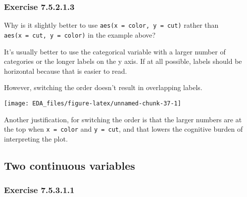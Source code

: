\documentclass[]{book}
\newenvironment{Shaded}{\begin{snugshade}}{\end{snugshade}}
\newcommand{\DataTypeTok}[1]{\textcolor[rgb]{0.13,0.29,0.53}{#1}}
\newcommand{\KeywordTok}[1]{\textcolor[rgb]{0.13,0.29,0.53}{\textbf{#1}}}
\newcommand{\NormalTok}[1]{#1}
\newcommand{\OperatorTok}[1]{\textcolor[rgb]{0.81,0.36,0.00}{\textbf{#1}}}
\newcommand{\StringTok}[1]{\textcolor[rgb]{0.31,0.60,0.02}{#1}}
\theoremstyle{plain}
\theoremstyle{remark}
\begin{document}
\hypertarget{exercise-7.5.2.1.3}{%
\subsubsection*{\texorpdfstring{Exercise
{7.5.2.1.3}}{Exercise 7.5.2.1.3}}\label{exercise-7.5.2.1.3}}

Why is it slightly better to use \texttt{aes(x\ =\ color,\ y\ =\ cut)}
rather than \texttt{aes(x\ =\ cut,\ y\ =\ color)} in the example above?

It's usually better to use the categorical variable with a larger number
of categories or the longer labels on the y axis. If at all possible,
labels should be horizontal because that is easier to read.

However, switching the order doesn't result in overlapping labels.

\begin{Shaded}
\end{Shaded}

\begin{center}\texttt{[image: EDA\_files/figure-latex/unnamed-chunk-37-1]} \end{center}

Another justification, for switching the order is that the larger
numbers are at the top when \texttt{x\ =\ color} and \texttt{y\ =\ cut},
and that lowers the cognitive burden of interpreting the plot.

\hypertarget{two-continuous-variables}{%
\subsection{Two continuous variables}\label{two-continuous-variables}}

\hypertarget{exercise-7.5.3.1.1}{%
\subsubsection*{\texorpdfstring{Exercise
{7.5.3.1.1}}{Exercise 7.5.3.1.1}}\label{exercise-7.5.3.1.1}}
\end{document}
